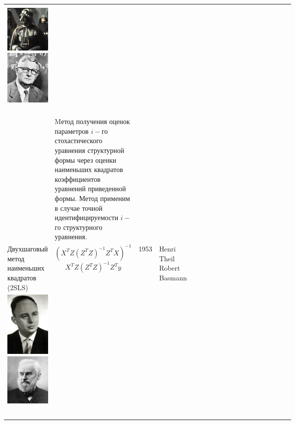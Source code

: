 \documentclass[10pt,a4paper]{article}
\begin{document}
\begin{table}
\begin{tabular}{|m{0.066\linewidth}|m{.11\linewidth}|m{.065\linewidth}|m{.05\linewidth}|m{0.205\linewidth}|m{0.412\linewidth}|}
\begin{minipage}[t]{\linewidth} \centering \ \\
\includegraphics[width=0.25\linewidth]{Darth_Vader.jpg} \hfill
\includegraphics[width=0.22\linewidth]{Sewall_Wright.jpg}\ \\
\end{minipage} & Mетод получения оценок параметров $i-$го стохастического уравнения структурной формы через оценки наименьших квадратов коэффициентов уравнений приведенной формы. Метод применим в случае точной идентифицируемости $i-$го структурного уравнения.\\
\hline
Двухшаговый метод наименьших квадратов (2SLS) & $$(X^T Z (Z^T Z)^{-1} Z^T X)^{-1}$$\- $$X^T Z(Z^T Z)^{-1} Z^Ty $$ & 1953 \newline   1957 & Henri Theil \newline Robert Basmann & \begin{minipage}[t]{\linewidth} \centering \ \\
\includegraphics[width=0.24\linewidth]{apf1-08280t.jpg} \hfill \includegraphics[width=0.3\linewidth]{AdonijahWelch.jpg}\ \\

\end{minipage}
\end{tabular}
\end{table}
\end{document}
